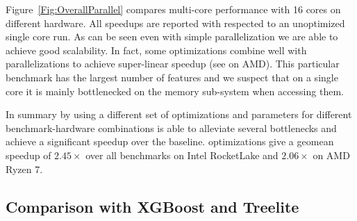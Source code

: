 Figure~\ref{Fig:OverallParallel} compares multi-core performance with 16 cores on different hardware. All speedups are
reported with respected to an unoptimized single core run. As can be seen even with simple parallelization 
we are able to achieve good scalability.
In fact, some optimizations combine well with parallelizations to achieve super-linear speedup (see  on AMD).
This particular benchmark has the largest number of features and we suspect that on a single core it is mainly bottlenecked
on the memory sub-system when accessing them.

In summary by using a different set of optimizations and parameters for different benchmark-hardware
combinations \Treebeard{} is able to alleviate several bottlenecks and achieve a significant speedup over the baseline.
\Treebeard{} optimizations give a geomean speedup of $2.45\times$ over all benchmarks on Intel RocketLake and 
$2.06\times$ on AMD Ryzen 7. 

\subsection{Comparison with XGBoost and Treelite}


